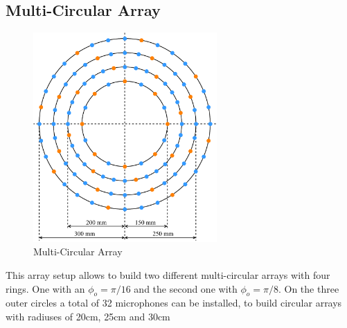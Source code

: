 \subsection{Multi-Circular Array}
\begin{minipage}{\linewidth}
	\begin{figure}
		\vspace{-0.8cm}
		\includegraphics[width=7cm]{images/5_array_evaluation/prototype_array_multi_circular.pdf}
		\centering
		\caption{Multi-Circular Array}
		\label{fig:prototype_array_multi_circular}
	\end{figure}
	This array setup allows to build two different multi-circular arrays with four rings.
	One with an $\phi_o = \pi/16$ and the second one with $\phi_o = \pi / 8$.
	On the three outer circles a total of 32 microphones can be installed, to 
	build circular arrays with radiuses of 20cm, 25cm and 30cm
\end{minipage}
\vspace{5.5cm}    %

